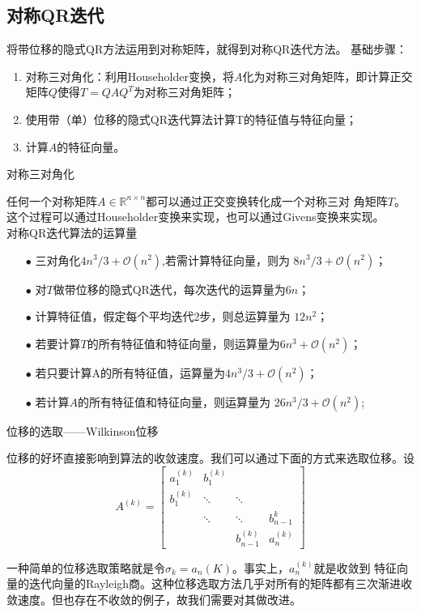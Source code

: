 \documentclass[12pt,a4paper]{article}
\begin{document}
\subsection{对称QR迭代}
将带位移的隐式QR方法运用到对称矩阵，就得到对称QR迭代方法。
基础步骤：
\begin{enumerate}[1.]
	\item 对称三对角化：利用Householder变换，将$A$化为对称三对角矩阵，即计算正交
	矩阵$Q$使得$T=QAQ^T$为对称三对角矩阵；
	\item 使用带（单）位移的隐式QR迭代算法计算T的特征值与特征向量；
	\item 计算$A$的特征向量。
\end{enumerate}
对称三对角化

任何一个对称矩阵$A\in \mathbb R^{n\times n}$都可以通过正交变换转化成一个对称三对
角矩阵$T$。这个过程可以通过Householder变换来实现，也可以通过Givens变换来实现。\\
对称QR迭代算法的运算量
\begin{itemize}
	\item[$\bullet$] 三对角化$4n^3/3+\mathcal O(n^2)$,若需计算特征向量，则为
	$8n^3/3+\mathcal O(n^2)$；
	\item[$\bullet$] 对$T$做带位移的隐式QR迭代，每次迭代的运算量为$6n$；
	\item[$\bullet$] 计算特征值，假定每个平均迭代2步，则总运算量为
	$12n^2$；
	\item[$\bullet$] 若要计算$T$的所有特征值和特征向量，则运算量为$6n^3+\mathcal
	O(n^2)$；
	\item[$\bullet$] 若只要计算A的所有特征值，运算量为$4n^3/3+\mathcal O(n^2)$；
	\item[$\bullet$] 若计算$A$的所有特征值和特征向量，则运算量为
	$26n^3/3+\mathcal O(n^2)$;
\end{itemize}

位移的选取——Wilkinson位移

位移的好坏直接影响到算法的收敛速度。我们可以通过下面的方式来选取位移。设
$$A^{(k)}=\begin{bmatrix}
a_1^{(k)}&b_1^{(k)}&&\\
b_1^{(k)}&\ddots &\ddots &\\
&\ddots &\ddots &b_{n-1}^{k}\\
&&b_{n-1}^{(k)}&a_n^{(k)}
\end{bmatrix}$$

一种简单的位移选取策略就是令$\sigma _k=a_n{(K)}$。事实上，$a_n^{(k)}$就是收敛到
特征向量的迭代向量的Rayleigh商。这种位移选取方法几乎对所有的矩阵都有三次渐进收敛速度。但也存在不收敛的例子，故我们需要对其做改进。
\end{document}
